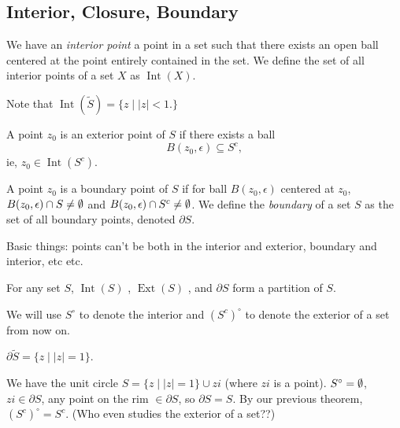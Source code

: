 \subsection{Interior, Closure, Boundary}
\begin{definition}
    We have an \emph{interior point} a point in a set such that there exists an open ball centered at the point entirely contained in the set. We define the set of all interior points of a set $X$ as $\operatorname{Int}(X)$.
\end{definition}
Note that $\operatorname{Int}(\widetilde{S})= \{z  \mid |z|<1.\} $
\begin{definition}
    A point $z_0$ is an exterior point of $S$ if there exists a ball  \[
        B(z_0, \epsilon) \subseteq S^{c},
    \]
    ie, $z_0\in \operatorname{Int}(S^{c}).$ 
\end{definition}
\begin{definition}
    A point $z_0$ is a boundary point of $S$ if for ball $B(z_0,\epsilon)$ centered at $z_0$, $B(z_0,\epsilon)\cap S \neq \emptyset$ and $B(z_0,\epsilon)\cap S^{c} \neq \emptyset$. We define the \emph{boundary} of a set $S$ as the set of all boundary points, denoted $\partial S$.
\end{definition}
Basic things: points can't be both in the interior and exterior, boundary and interior, etc etc.
\begin{theorem}
    For any set $S$, $\operatorname{Int}(S)$ , $\operatorname{Ext}(S)$ , and $\partial S$ form a partition of $S$.
\end{theorem}
We will use  $S^{\circ}$ to denote the interior and $(S^{c})^{\circ}$ to denote the exterior of a set from now on.
\begin{example}
    $\partial \widetilde{S} = \{z  \mid  |z|=1\} $.
\end{example}
\begin{example}
    We have the unit circle $S = \{z  \mid  |z|=1\} \cup zi$ (where $zi$ is a point). $S^{\circ}=\emptyset$, $zi \in \partial S$, any point on the rim  $\in \partial S$, so $\partial S = S$. By our previous theorem, $(S^{c})^{\circ}=S^{c}.$ (Who even studies the exterior of a set??)
\end{example}

